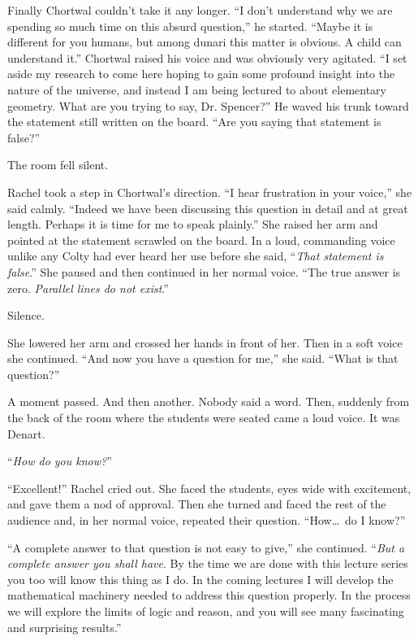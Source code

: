 Finally Chortwal couldn't take it any longer. ``I don't understand why we are spending so much
time on this absurd question,'' he started. ``Maybe it is different for you humans, but among
dunari this matter is obvious. A child can understand it.'' Chortwal raised his voice and was
obviously very agitated. ``I set aside my research to come here hoping to gain some profound
insight into the nature of the universe, and instead I am being lectured to about elementary
geometry. What are you trying to say, Dr. Spencer?'' He waved his trunk toward the statement
still written on the board. ``Are you saying that statement is false?''

The room fell silent.

Rachel took a step in Chortwal's direction. ``I hear frustration in your voice,'' she said
calmly. ``Indeed we have been discussing this question in detail and at great length. Perhaps it
is time for me to speak plainly.'' She raised her arm and pointed at the statement scrawled on
the board. In a loud, commanding voice unlike any Colty had ever heard her use before she said,
``\emph{That statement is false}.'' She paused and then continued in her normal voice. ``The
true answer is zero. \emph{Parallel lines do not exist}.''

Silence.

She lowered her arm and crossed her hands in front of her. Then in a soft voice she continued.
``And now you have a question for me,'' she said. ``What is that question?''

A moment passed. And then another. Nobody said a word. Then, suddenly from the back of the room
where the students were seated came a loud voice. It was Denart.

``\emph{How do you know?}''

``Excellent!'' Rachel cried out. She faced the students, eyes wide with excitement, and gave
them a nod of approval. Then she turned and faced the rest of the audience and, in her normal
voice, repeated their question. ``How\ldots\ do I know?''

``A complete answer to that question is not easy to give,'' she continued. ``\emph{But a
complete answer you shall have}. By the time we are done with this lecture series you too will
know this thing as I do. In the coming lectures I will develop the mathematical machinery needed
to address this question properly. In the process we will explore the limits of logic and
reason, and you will see many fascinating and surprising results.''

